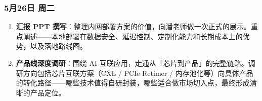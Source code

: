 \subsubsection{5月26日 周二}

\begin{taskbox}

\begin{enumerate}
  \item \textbf{汇报 PPT 撰写}：整理内网部署方案的价值，向潘老师做一次正式的展示。重点阐述——本地部署在数据安全、延迟控制、定制化能力和长期成本上的优势，以及落地路线图。
  \item \textbf{产品线深度调研}：围绕 AI 互联应用，走通从「芯片到产品」的完整链路。调研方向包括芯片互联方案（CXL / PCIe Retimer / 内存池化等）向具体产品的转化路径——哪些技术值得自研封装，哪些适合做市场切入点，最终形成清晰的产品定位。
\end{enumerate}

\end{taskbox}

